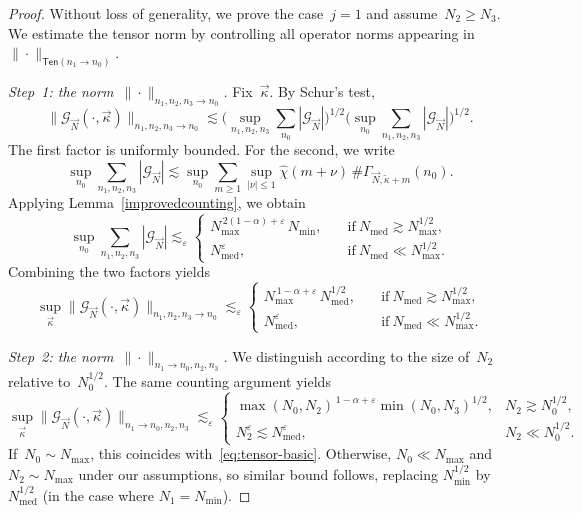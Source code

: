\documentclass[11pt,reqno,english]{amsart}
\numberwithin{equation}{section}
\theoremstyle{plain}
\theoremstyle{definition}
\theoremstyle{remark}
\begin{document}
	\begin{proof}
		Without loss of generality, we prove the case~$j=1$ and assume~$N_2\ge N_3$.
		We estimate the tensor norm by controlling all operator norms
		appearing in~$\|\cdot\|_{\mathsf{Ten}(n_{1}\to n_{0})}$.
		
		\emph{Step~1: the norm~$\|\cdot\|_{n_1,n_2,n_3\to n_0}$.}
		Fix~$\vec\kappa$. By Schur's test,
		\[
		\|\mathcal G_{\vec N}(\cdot,\vec\kappa)\|_{n_1,n_2,n_3\to n_0}
		\lesssim
		\Big(\sup_{n_1,n_2,n_3}\sum_{n_0}|\mathcal G_{\vec N}|\Big)^{1/2}
		\Big(\sup_{n_0}\sum_{n_1,n_2,n_3}|\mathcal G_{\vec N}|\Big)^{1/2}.
		\]
		The first factor is uniformly bounded.
		For the second, we write
		\[
		\sup_{n_0}\sum_{n_1,n_2,n_3}|\mathcal G_{\vec N}|
		\lesssim
		\sup_{n_0}\sum_{m\ge1}\sup_{|\nu|\le1}
		\widehat\chi(m+\nu)\,
		\#\Gamma_{\vec N,\widetilde\kappa+m}(n_0).
		\]
		Applying Lemma~\ref{improvedcounting}, we obtain
		\[
		\sup_{n_0}\sum_{n_1,n_2,n_3}|\mathcal G_{\vec N}|
		\lesssim_{\varepsilon}
		\begin{cases}
			N_{\max}^{\,2(1-\alpha)+\varepsilon}\,N_{\min},
			&\quad \text{if}\ N_{\mathrm{med}}\gtrsim N_{\max}^{1/2},\\
			N_{\mathrm{med}}^{\varepsilon},
			&\quad \text{if}\ N_{\mathrm{med}}\ll N_{\max}^{1/2}.
		\end{cases}
		\]
		Combining the two factors yields
		\begin{equation}
			\label{eq:tensor-basic}
			\sup_{\vec\kappa}
			\|\mathcal G_{\vec N}(\cdot,\vec\kappa)\|_{n_1,n_2,n_3\to n_0}
			\lesssim_{\varepsilon}
			\begin{cases}
				N_{\max}^{\,1-\alpha+\varepsilon}\,N_{\mathrm{med}}^{1/2},
				&\quad \text{if}\  N_{\mathrm{med}}\gtrsim N_{\max}^{1/2},\\
				N_{\mathrm{med}}^{\varepsilon},
				&\quad \text{if}\  N_{\mathrm{med}}\ll N_{\max}^{1/2}.
			\end{cases}
		\end{equation}
		
		\emph{Step~2: the norm~$\|\cdot\|_{n_1\to n_0,n_2,n_3}$.}
		We distinguish according to the size of~$N_2$ relative to~$N_0^{1/2}$.
		The same counting argument yields
		\[
		\sup_{\vec\kappa}
		\|\mathcal G_{\vec N}(\cdot,\vec\kappa)\|_{n_1\to n_0,n_2,n_3}
		\lesssim_{\varepsilon}
		\begin{cases}
			\max(N_0,N_2)^{\,1-\alpha+\varepsilon}\min(N_0,N_3)^{1/2},
			& N_2\gtrsim N_0^{1/2},\\
			N_2^{\varepsilon}\lesssim N_{\mathrm{med}}^{\varepsilon},
			& N_2\ll N_0^{1/2}.
		\end{cases}
		\]
		If~$N_0\sim N_{\max}$, this coincides with~\eqref{eq:tensor-basic}.
		Otherwise, $N_0\ll N_{\max}$ and~$N_2\sim N_{\max}$ under our assumptions, so similar bound follows, replacing $N_{\min}^{1/2}$ by $N_{\mathrm{med}}^{1/2}$ (in the case where $N_1=N_{\min}$).
		

\end{proof}
\end{document}
